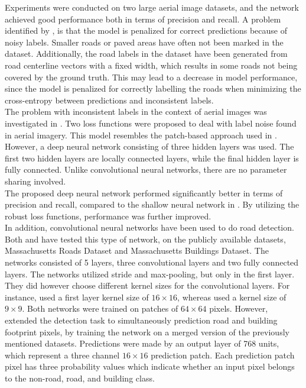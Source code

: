 Experiments were conducted on two large aerial image datasets, and the network achieved good performance both in terms of precision and recall. A problem identified by \cite{Mnih_roads_high_res_aerial_images}, is that the model is penalized for correct predictions because of noisy labels. Smaller roads or paved areas have often not been marked in the dataset. Additionally, the road labels in the dataset have been generated from road centerline vectors with a fixed width, which results in some roads not being covered by the ground truth. This may lead to a decrease in model performance, since the model is penalized for correctly labelling the roads when minimizing the cross-entropy between predictions and inconsistent labels.\\

The problem with inconsistent labels in the context of aerial images was investigated in \citep{Mnih_aerial_images_noisy}. Two loss functions were proposed to deal with label noise found in aerial imagery. This model resembles the patch-based approach used in \cite{Mnih_roads_high_res_aerial_images}. However, a deep neural network consisting of three hidden layers was used. The first two hidden layers are locally connected layers, while the final hidden layer is fully connected. Unlike convolutional neural networks, there are no parameter sharing involved. \\

The proposed deep neural network performed significantly better in terms of precision and recall, compared to the shallow neural network in \citep{Mnih_roads_high_res_aerial_images}. By utilizing the robust loss functions, performance was further improved.\\

In addition, convolutional neural networks have been used to do road detection. Both \cite{MnihThesis} and \cite{saito_building_and_roads} have tested this type of network, on the publicly available datasets, Massachusetts Roads Dataset and Massachusetts Buildings Dataset. The networks consisted of 5 layers, three convolutional layers and two fully connected layers. The networks utilized stride and max-pooling, but only in the first layer. They did however choose different kernel sizes for the convolutional layers. For instance, \cite{MnihThesis} used a first layer kernel size of $16 \times 16$, whereas \cite{saito_building_and_roads} used a kernel size of $9 \times9$.  Both networks were trained on patches of $64 \times 64$ pixels. However, \cite{saito_building_and_roads} extended the detection task to simultaneously prediction road and building footprint pixels, by training the network on a merged version of the previously mentioned datasets. Predictions were made by an output layer of 768 units, which represent a three channel $16 \times 16$ prediction patch. Each prediction patch pixel has three probability values which indicate whether an input pixel belongs to the non-road, road, and building class.\\

